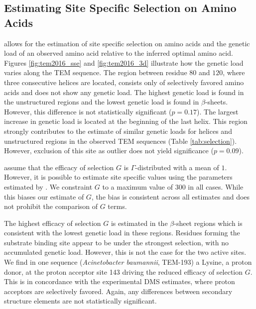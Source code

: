 \subsection{Estimating Site Specific Selection on Amino Acids}
\selac allows for the estimation of site specific selection on amino acids and the genetic load of an observed amino acid relative to the inferred optimal amino acid.
Figures \ref{fig:tem2016_sse} and \ref{fig:tem2016_3d} illustrate how the genetic load varies along the TEM sequence.
The region between residue $80$ and $120$, where three consecutive helices are located, consists only of selectively favored amino acids and does not show any genetic load. 
The highest genetic load is found in the unstructured regions and the lowest genetic load is found in $\beta$-sheets.
However, this difference is not statistically significant ($p = 0.17$).
The largest increase in genetic load is located at the beginning of the last helix.
This region strongly contributes to the estimate of similar genetic loads for helices and unstructured regions in the observed TEM sequences (Table \ref{tab:selection}).
However, exclusion of this site as outlier does not yield significance ($p = 0.09$).

\selac assume that the efficacy of selection $G$ is $\Gamma$-distributed with a mean of $1$. 
However, it is possible to estimate site specific values using the parameters estimated by \selac.
We constraint $G$ to a maximum value of $300$ in all cases.
While this biases our estimate of $G$, the bias is consistent across all estimates and does not prohibit the comparison of $G$ terms.

The highest efficacy of selection $G$ is estimated in the $\beta$-sheet regions which is consistent with the lowest genetic load in these regions.
Residues forming the substrate binding site appear to be under the strongest selection, with no accumulated genetic load.
However, this is not the case for the two active sites.
We find in one sequence (\textit{Acinetobacter baumannii}, TEM-193) a Lysine, a proton donor, at the proton acceptor site 143 driving the reduced efficacy of selection $G$. 
This is in concordance with the experimental DMS estimates, where proton acceptors are selectively favored.
Again, any differences between secondary structure elements are not statistically significant.

